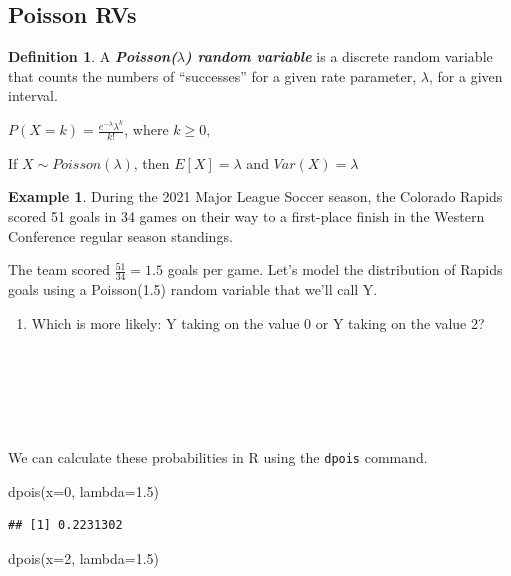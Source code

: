 \documentclass[
  11pt,
]{book}
\newenvironment{Shaded}{\begin{snugshade}}{\end{snugshade}}
\newcommand{\AttributeTok}[1]{\textcolor[rgb]{0.77,0.63,0.00}{#1}}
\newcommand{\DecValTok}[1]{\textcolor[rgb]{0.00,0.00,0.81}{#1}}
\newcommand{\FloatTok}[1]{\textcolor[rgb]{0.00,0.00,0.81}{#1}}
\newcommand{\FunctionTok}[1]{\textcolor[rgb]{0.00,0.00,0.00}{#1}}
\newcommand{\NormalTok}[1]{#1}
\providecommand{\tightlist}{%
  \setlength{\itemsep}{0pt}\setlength{\parskip}{0pt}}
\theoremstyle{definition}
\newtheorem{definition}{Definition}[chapter]
\theoremstyle{definition}
\newtheorem{example}{Example}[chapter]
\theoremstyle{definition}
\theoremstyle{definition}
\theoremstyle{remark}
\begin{document}
\hypertarget{poisson-rvs}{%
\subsection{Poisson RVs}\label{poisson-rvs}}

\begin{definition}
A \textbf{\emph{Poisson(\(\lambda\)) random variable}} is a discrete random variable that counts the numbers of ``successes'' for a given rate parameter, \(\lambda\), for a given interval.

\(P(X=k) = \frac{e^{-\lambda}\lambda^k}{k!}\), where \(k \geq 0,\)

If \(X \sim Poisson(\lambda)\), then \(E[X]=\lambda\) and \(Var(X)=\lambda\)
\end{definition}

\begin{example}
During the 2021 Major League Soccer season, the Colorado Rapids scored 51 goals in 34 games on their way to a first-place finish in the Western Conference regular season standings.

The team scored \(\frac{51}{34} = 1.5\) goals per game. Let's model the distribution of Rapids goals using a Poisson(1.5) random variable that we'll call Y.
\end{example}

\begin{enumerate}
\def\labelenumi{(\alph{enumi})}
\tightlist
\item
  Which is more likely: Y taking on the value 0 or Y taking on the value 2?\\
  \strut \\
  \strut \\
  \strut \\
\end{enumerate}

We can calculate these probabilities in R using the \texttt{dpois} command.

\begin{Shaded}
\begin{Highlighting}[]
\FunctionTok{dpois}\NormalTok{(}\AttributeTok{x=}\DecValTok{0}\NormalTok{, }\AttributeTok{lambda=}\FloatTok{1.5}\NormalTok{)}
\end{Highlighting}
\end{Shaded}

\begin{verbatim}
## [1] 0.2231302
\end{verbatim}

\begin{Shaded}
\begin{Highlighting}[]
\FunctionTok{dpois}\NormalTok{(}\AttributeTok{x=}\DecValTok{2}\NormalTok{, }\AttributeTok{lambda=}\FloatTok{1.5}\NormalTok{)}
\end{Highlighting}
\end{Shaded}
\end{document}
